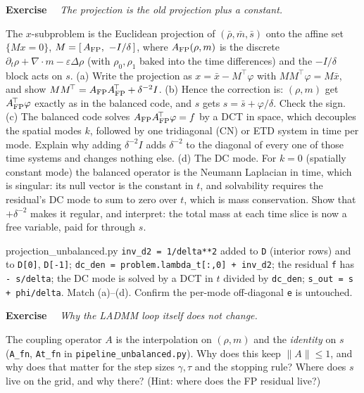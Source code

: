 \documentclass[11pt]{article}
\newcommand{\eps}{\varepsilon}
\newcommand{\code}[1]{\texttt{#1}}
\newcommand{\dv}{\nabla\cdot}
\newcounter{ex}
\newenvironment{ex}[1]{\refstepcounter{ex}\par\medskip\noindent\textbf{Exercise \theex}\ \ \textit{#1}\par\nopagebreak\smallskip}{\par\medskip}
\begin{document}
\begin{ex}{The projection is the old projection plus a constant.}
The $x$-subproblem is the Euclidean projection of $(\bar\rho,\bar m,\bar s)$ onto the affine
set $\{M x=0\}$, $M=[\,A_{\rm FP},\ -I/\delta\,]$, where $A_{\rm FP}(\rho,m)$ is the discrete
$\partial_t\rho+\dv m-\eps\Delta\rho$ (with $\rho_0,\rho_1$ baked into the time
differences) and the $-I/\delta$ block acts on $s$.
(a) Write the projection as $x=\bar x-M^{\!\top}\varphi$ with $MM^{\!\top}\varphi=M\bar x$, and
show $MM^{\!\top}=A_{\rm FP}A_{\rm FP}^{\!\top}+\delta^{-2}I$.
(b) Hence the correction is: $(\rho,m)$ get $A_{\rm FP}^{\!\top}\varphi$ exactly as in the
balanced code, and $s$ gets $s=\bar s+\varphi/\delta$. Check the sign.
(c) The balanced code solves $A_{\rm FP}A_{\rm FP}^{\!\top}\varphi=f$ by a DCT in space, which
decouples the spatial modes $k$, followed by one tridiagonal (CN) or ETD system in time per
mode. Explain why adding $\delta^{-2}I$ adds $\delta^{-2}$ to the diagonal of every one of
those time systems and changes nothing else.
(d) The DC mode. For $k=0$ (spatially constant mode) the balanced operator is the Neumann
Laplacian in time, which is singular: its null vector is the constant in $t$, and solvability
requires the residual's DC mode to sum to zero over $t$, which is mass conservation. Show
that $+\delta^{-2}$ makes it regular, and interpret: the total mass at each time slice is now
a free variable, paid for through $s$.
\end{ex}

\begin{codebox}{projection\_unbalanced.py}
\code{inv\_d2 = 1/delta**2} added to \code{D} (interior rows) and to \code{D[0]},
\code{D[-1]}; \code{dc\_den = problem.lambda\_t[:,0] + inv\_d2}; the residual \code{f} has
\code{- s/delta}; the DC mode is solved by a DCT in $t$ divided by \code{dc\_den};
\code{s\_out = s + phi/delta}. Match (a)--(d). Confirm the per-mode off-diagonal \code{e}
is untouched.
\end{codebox}

\begin{ex}{Why the LADMM loop itself does not change.}
The coupling operator $A$ is the interpolation on $(\rho,m)$ and the \emph{identity} on $s$
(\code{A\_fn}, \code{At\_fn} in \code{pipeline\_unbalanced.py}). Why does this keep
$\|A\|\le1$, and why does that matter for the step sizes $\gamma,\tau$ and the stopping rule?
Where does $s$ live on the grid, and why there? (Hint: where does the FP residual live?)
\end{ex}
\end{document}
